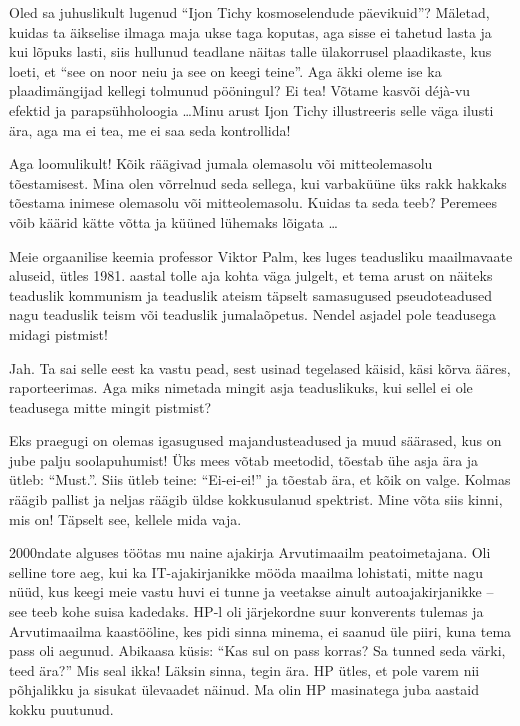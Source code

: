 Oled sa juhuslikult lugenud \enquote{Ijon Tichy kosmoselendude 
päevikuid}? Mäletad, 
kuidas ta äikselise ilmaga maja ukse taga koputas, aga sisse ei tahetud lasta ja kui 
lõpuks lasti, siis hullunud teadlane näitas talle ülakorrusel 
plaadikaste, kus loeti, et \enquote{see on noor neiu ja see on keegi teine}. 
Aga äkki oleme ise ka plaadimängijad kellegi tolmunud pööningul? Ei tea! Võtame kasvõi
déjà-vu efektid ja parapsühholoogia \ldots Minu arust Ijon Tichy illustreeris selle väga ilusti 
ära, aga ma ei tea, me ei saa seda kontrollida! 


Aga loomulikult! Kõik räägivad jumala olemasolu või
mitteolemasolu tõestamisest. Mina olen võrrelnud seda sellega, kui varbaküüne 
üks rakk hakkaks tõestama inimese olemasolu või mitteolemasolu. Kuidas ta seda 
teeb? Peremees võib käärid kätte võtta ja küüned lühemaks lõigata \ldots

Meie orgaanilise keemia professor Viktor Palm, kes
luges teadusliku maailmavaate aluseid, ütles 1981. aastal tolle aja kohta väga julgelt, et tema arust on näiteks teaduslik kommunism ja teaduslik 
ateism täpselt samasugused pseudoteadused nagu teaduslik teism või teaduslik 
jumalaõpetus. Nendel asjadel pole teadusega midagi pistmist!


Jah. Ta sai selle eest ka vastu pead, sest usinad tegelased käisid, käsi kõrva ääres, raporteerimas. Aga miks nimetada mingit asja 
teaduslikuks, kui sellel ei ole teadusega mitte mingit pistmist?


Eks praegugi on olemas igasugused majandusteadused ja muud säärased, kus on
jube palju soolapuhumist! Üks mees võtab meetodid, tõestab ühe 
asja ära ja ütleb: \enquote{Must.}. Siis ütleb teine: \enquote{Ei-ei-ei!} ja tõestab 
ära, et kõik on valge. Kolmas räägib pallist ja neljas räägib üldse kokkusulanud spektrist. Mine võta siis kinni, mis on! Täpselt see, kellele mida vaja.


2000ndate alguses töötas mu naine ajakirja 
Arvutimaailm peatoimetajana. Oli selline tore aeg, kui 
ka IT-ajakirjanikke mööda maailma lohistati, mitte nagu nüüd, kus keegi meie 
vastu huvi ei tunne ja veetakse ainult autoajakirjanikke -- see teeb kohe suisa 
kadedaks. HP-l oli järjekordne suur konverents tulemas ja 
Arvutimaailma kaastööline, kes pidi sinna minema, ei saanud üle piiri, kuna tema pass oli aegunud. Abikaasa küsis: \enquote{Kas sul on pass korras? Sa tunned 
seda värki, teed ära?} Mis seal ikka! Läksin sinna, tegin ära. HP ütles, et pole varem nii
põhjalikku ja sisukat ülevaadet näinud. Ma olin HP masinatega 
juba aastaid kokku puutunud. 

